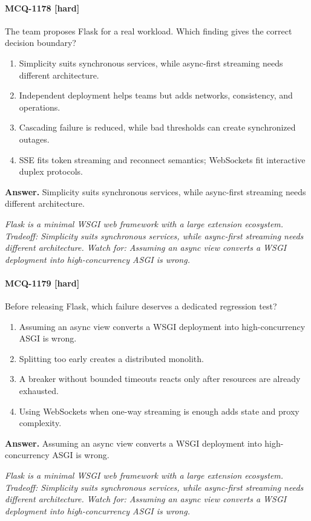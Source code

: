 \paragraph{MCQ-1178 [hard]} The team proposes Flask for a real workload. Which finding gives the correct decision boundary?
\begin{enumerate}[label=\Alph*.]
\item Simplicity suits synchronous services, while async-first streaming needs different architecture.
\item Independent deployment helps teams but adds networks, consistency, and operations.
\item Cascading failure is reduced, while bad thresholds can create synchronized outages.
\item SSE fits token streaming and reconnect semantics; WebSockets fit interactive duplex protocols.
\end{enumerate}
\noindent\textbf{Answer.} Simplicity suits synchronous services, while async-first streaming needs different architecture.
\par\textit{Flask is a minimal WSGI web framework with a large extension ecosystem. Tradeoff: Simplicity suits synchronous services, while async-first streaming needs different architecture. Watch for: Assuming an async view converts a WSGI deployment into high-concurrency ASGI is wrong.}
\paragraph{MCQ-1179 [hard]} Before releasing Flask, which failure deserves a dedicated regression test?
\begin{enumerate}[label=\Alph*.]
\item Assuming an async view converts a WSGI deployment into high-concurrency ASGI is wrong.
\item Splitting too early creates a distributed monolith.
\item A breaker without bounded timeouts reacts only after resources are already exhausted.
\item Using WebSockets when one-way streaming is enough adds state and proxy complexity.
\end{enumerate}
\noindent\textbf{Answer.} Assuming an async view converts a WSGI deployment into high-concurrency ASGI is wrong.
\par\textit{Flask is a minimal WSGI web framework with a large extension ecosystem. Tradeoff: Simplicity suits synchronous services, while async-first streaming needs different architecture. Watch for: Assuming an async view converts a WSGI deployment into high-concurrency ASGI is wrong.}
